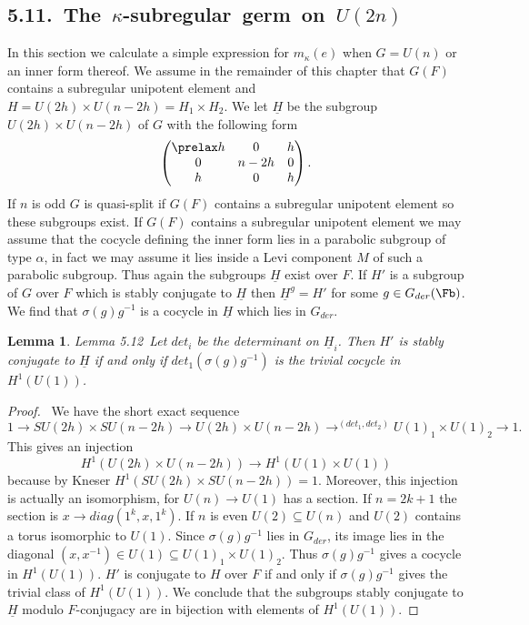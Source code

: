 \documentclass{memo-l}
\newtheorem{lemma}[theorem]{Lemma}
\theoremstyle{definition}
\theoremstyle{remark}
\numberwithin{section}{chapter}
\numberwithin{equation}{chapter}
\begin{document}
\setcounter{subsection}{10} %

\subsection{5.11.\  The\ $\kappa$-subregular\ germ\ on\ $U(2n)$}

In this section we calculate a simple expression for $m_{{\kappa}}(e)$
when $G = U(n)$ or an inner form thereof.  We assume in the remainder
of this chapter that $G(F)$ contains a subregular unipotent element
and $H = U(2h) \times U(n-2h) = H_{1} \times H_{2}$.  We let
$\underline{H}$ be the subgroup $U(2h) \times U(n-2h)$ of $G$ with the
following form
$$
\begin{pmatrix} \prelax
h & 0 & h \\ 0 & n-2h & 0 \\ h & 0 & h
\end{pmatrix}.
$$
If $n$ is odd $G$ is quasi-split if $G(F)$ contains a subregular unipotent
element so these subgroups exist.  If $G(F)$ contains a subregular
unipotent element we may assume that the cocycle defining the inner form
lies in a parabolic subgroup of type ${\alpha}$, in fact we may assume it
lies inside a Levi component $M$ of such a parabolic subgroup.  Thus again
the subgroups $\underline{H}$ exist over $F$.  If $H'$ is a subgroup of $G$ over
$F$ which is stably conjugate to $\underline{H}$ then $\underline{H}^{g}  =  H'$ for some
$g  \in  G_{der}(\Fb)$.  We find that ${\sigma}(g)g^{-1}$ is a cocycle
in $\underline{H}$ which lies in $G_{der}$.

\setcounter{theorem}{11} %

\begin{lemma}{Lemma 5.12}\ Let $det_{i}$ be the determinant on $\underline{H}_{i}$.
Then $H'$ is stably conjugate to $\underline{H}$ if and only if
$det_{1}({\sigma}(g)g^{-1})$ is the trivial cocycle in $H^{1}(U(1))$.
\end{lemma}


\begin{proof} \ We have the short exact sequence
$$
1 {\to} SU(2h) \times SU(n-2h) {\to} U(2h) \times U(n-2h)
\longrightarrow^{(det_{1},det_{2})}
U(1)_{1} \times U(1)_{2} {\to} 1.
$$
This gives an injection
$$
H^{1}(U(2h) \times U(n-2h)) {\to} H^{1}(U(1) \times U(1))
$$
because by Kneser \cites{MR0188219,MR0174559} $H^{1}(SU(2h) \times SU(n-2h))  =  1$.  Moreover, this
injection is actually an isomorphism, for $U(n) {\to} U(1)$ has a section.
If $n  =  2k+1$ the section is $x {\to} diag(1^{k},x,1^{k})$.  If $n$ is
even $U(2) {\subseteq} U(n)$ and $U(2)$ contains a torus isomorphic to
$U(1)$.  Since ${\sigma}(g)g^{-1}$ lies in $G_{der}$, its image lies in the
diagonal $(x,x^{-1})  \in  U(1) {\subseteq} U(1)_{1} \times U(1)_{2}$.
Thus ${\sigma}(g)g^{-1}$ gives a cocycle in $H^{1}(U(1))$.  $H'$ is
conjugate to $H$ over $F$ if and only if ${\sigma}(g)g^{-1}$ gives the
trivial class of $H^{1}(U(1))$.  We conclude that the subgroups stably
conjugate to $\underline{H}$ modulo $F$-conjugacy are in bijection with elements
of $H^{1}(U(1))$.
\end{proof}
\end{document}
